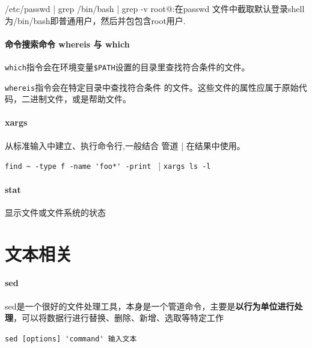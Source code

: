 \documentclass[UTF8,a4paper,12pt]{ctexbook}
\begin{document}
			\verb@cat /etc/passwd | grep /bin/bash | grep -v root@:在passwd 文件中截取默认登录shell 为/bin/bash即普通用户，然后并包包含root用户.
		\paragraph{命令搜索命令 whereis 与 which}
			\verb|which|指令会在环境变量\verb|$PATH|设置的目录里查找符合条件的文件。
			
			\verb|whereis|指令会在特定目录中查找符合条件 的文件。这些文件的属性应属于原始代码，二进制文件，或是帮助文件。
			
		\paragraph{xargs} 从标准输入中建立、执行命令行,一般结合 管道 | 在结果中使用。
		
			\hspace{1cm} \verb|find ~ -type f -name 'foo*' -print | | \verb|xargs ls -l|

		\paragraph{stat} 显示文件或文件系统的状态
	
	\section{文本相关}
				
		\paragraph{sed}sed是一个很好的文件处理工具，本身是一个管道命令，主要是\textbf{以行为单位进行处理}，可以将数据行进行替换、删除、新增、选取等特定工作
			
			\verb|sed [options] 'command' 输入文本|
			
\end{document}
